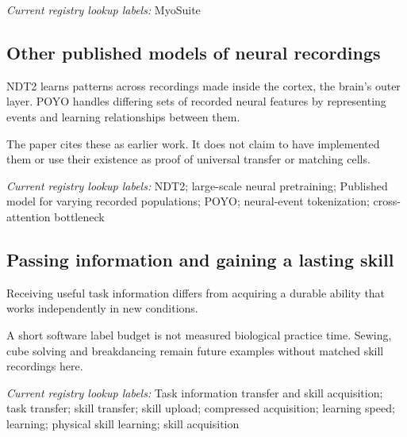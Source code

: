 \noindent\textit{Current registry lookup labels:} MyoSuite\par

\begin{samepage}
\subsection*{Other published models of neural recordings}
\noindent NDT2 learns patterns across recordings made inside the cortex, the brain’s outer layer. POYO handles differing sets of recorded neural features by representing events and learning relationships between them.\cite{ndt2_2023,poyo2023}\par
\end{samepage}
\begin{samepage}
\noindent The paper cites these as earlier work. It does not claim to have implemented them or use their existence as proof of universal transfer or matching cells.\par\nopagebreak[4]

\end{samepage}


\noindent\textit{Current registry lookup labels:} NDT2; large-scale neural pretraining; Published model for varying recorded populations; POYO; neural-event tokenization; cross-attention bottleneck\par

\begin{samepage}
\subsection*{Passing information and gaining a lasting skill}
\noindent Receiving useful task information differs from acquiring a durable ability that works independently in new conditions.\par
\end{samepage}
\begin{samepage}
\noindent A short software label budget is not measured biological practice time. Sewing, cube solving and breakdancing remain future examples without matched skill recordings here.\par\nopagebreak[4]

\end{samepage}


\noindent\textit{Current registry lookup labels:} Task information transfer and skill acquisition; task transfer; skill transfer; skill upload; compressed acquisition; learning speed; learning; physical skill learning; skill acquisition\par

